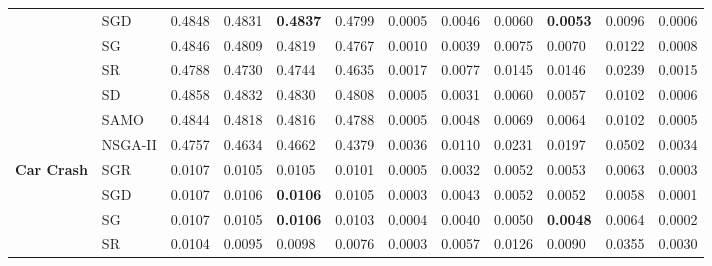 \begin{table*}[!htb]
\begin{tabular}{|l|l|l|l|l|l|l|l|l|l|l|l|}
		& SGD                 & 0.4848         & 0.4831         & \textbf{0.4837}           & 0.4799          & 0.0005        & 0.0046         & 0.0060         & \textbf{0.0053}           & 0.0096          & 0.0006              \\ 
		& SG                  & 0.4846         & 0.4809         & 0.4819           & 0.4767          & 0.0010        & 0.0039         & 0.0075         & 0.0070           & 0.0122          & 0.0008               \\ 
		& SR                  & 0.4788         & 0.4730         & 0.4744           & 0.4635          & 0.0017  & 0.0077         & 0.0145         & 0.0146           & 0.0239          & 0.0015               \\ 
		& SD                  & 0.4858         & 0.4832         & 0.4830           & 0.4808          & 0.0005 & 0.0031         & 0.0060         & 0.0057           & 0.0102          & 0.0006               \\ 
		& SAMO                & 0.4844         & 0.4818         & 0.4816           & 0.4788          & 0.0005         & 0.0048         & 0.0069         & 0.0064           & 0.0102          & 0.0005               \\ 
		& NSGA-II             & 0.4757         & 0.4634         & 0.4662           & 0.4379          & 0.0036    & 0.0110         & 0.0231         & 0.0197           & 0.0502          & 0.0034               \\ \hline						
		\multirow{7}{*}{\textbf{Car Crash}}                             & SGR                 & 0.0107         & 0.0105         & 0.0105           & 0.0101          & 0.0005           & 0.0032         & 0.0052         & 0.0053           & 0.0063          & 0.0003                 \\ 
		& SGD                 & 0.0107         & 0.0106         & \textbf{0.0106}           & 0.0105          & 0.0003            & 0.0043         & 0.0052         & 0.0052           & 0.0058          & 0.0001              \\ 
		& SG                  & 0.0107         & 0.0105         & \textbf{0.0106}           & 0.0103          & 0.0004            & 0.0040         & 0.0050         & \textbf{0.0048}           & 0.0064          & 0.0002               \\ 
		& SR                  & 0.0104         & 0.0095         & 0.0098           & 0.0076          & 0.0003           & 0.0057         & 0.0126         & 0.0090           & 0.0355          & 0.0030              \\ 

\end{tabular}
\end{table*}
